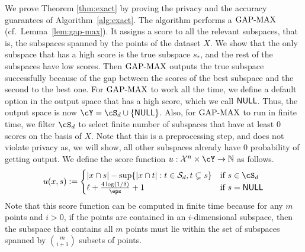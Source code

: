 We prove Theorem \ref{thm:exact} by proving the privacy and
the accuracy guarantees of Algorithm~\ref{alg:exact}.
The algorithm performs a $\mathrm{GAP\text{-}MAX}$ (cf.~Lemma~\ref{lem:gap-max}).
It assigns a score to all the relevant
subspaces, that is, the subspaces spanned by the points
of the dataset $X$. We show that the only subspace that
has a high score is the true subspace $s_*$, and the rest
of the subspaces have low scores. Then $\mathrm{GAP\text{-}MAX}$ outputs
the true subspace successfully because of the gap between
the scores of the best subspace and the second to the best
one. For $\mathrm{GAP\text{-}MAX}$ to work all the time, we define a default
option in the output space that has a high score, which we
call $\mathsf{NULL}$. Thus, the output space is now
$\cY = \cS_d \cup \{\NULL\}$. Also, for $\mathrm{GAP\text{-}MAX}$ to run in
finite time, we filter $\cS_d$ to select finite number of subspaces
that have at least $0$ scores on the basis of $X$. Note that
this is a preprocessing step, and does not violate privacy as,
we will show, all other subspaces already have $0$ probability
of getting output.
We define the score function
$u : \mathcal{X}^n \times \cY \to \mathbb{N}$
as follows.
\[ u(x,s) :=
\begin{cases}
    |x \cap s| - \sup \{ |x \cap t| : t \in \mathcal{S}_d, t \subsetneq s \} &
        \text{if $s \in \cS_d$}\\
    \ell + \frac{4\log(1/\delta)}{\eps} + 1 & \text{if $s = \NULL$}
\end{cases}
\]
Note that this score function can be computed in finite
time because for any $m$ points and $i>0$, if the points
are contained in an $i$-dimensional subspace, then the
subspace that contains all $m$ points must lie within
the set of subspaces spanned by ${m \choose i+1}$ subsets
of points.


